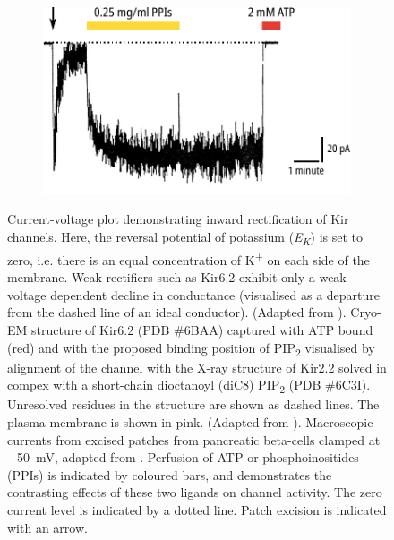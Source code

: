 \begin{figure}[hbtp]
\begin{subfigure}[t]{0.6\textwidth}
		\caption{}\label{ch1fig:fan_trace}
		\centering
		\includegraphics[width=\textwidth]{fan_pip_trace.pdf}
	\end{subfigure}
	\caption[Structure of Kir6.2]{
		{\bf{}}
		 Current-voltage plot demonstrating inward rectification of Kir channels.
		Here, the reversal potential of potassium (\textit{E\textsubscript{K}}) is set to zero, i.e. there is an equal concentration of K\textsuperscript{+} on each side of the membrane.
		Weak rectifiers such as Kir6.2 exhibit only a weak voltage dependent decline in conductance (visualised as a departure from the dashed line of an ideal conductor).
		(Adapted from \textcite{zheng_handbook_2015}).
		 Cryo-EM structure of Kir6.2 (PDB \#6BAA) captured with ATP bound (red) and with the proposed binding position of PIP\textsubscript{2} visualised by alignment of the channel with the X-ray structure of Kir2.2 solved in compex with a short-chain dioctanoyl (diC8) PIP\textsubscript{2} (PDB \#6C3I).
		Unresolved residues in the structure are shown as dashed lines.
		The plasma membrane is shown in pink.
		(Adapted from \textcite{puljung_cryo-electron_2018}).
		 Macroscopic currents from excised patches from pancreatic beta-cells clamped at \SI{-50}{\milli\volt}, adapted from \textcite{fan_anionic_1997}.
		Perfusion of ATP or phosphoinositides (PPIs) is indicated by coloured bars, and demonstrates the contrasting effects of these two ligands on channel activity.
		The zero current level is indicated by a dotted line.
		Patch excision is indicated with an arrow.
	}
	\label{ch1fig:kir_breakdown}
\end{figure}

